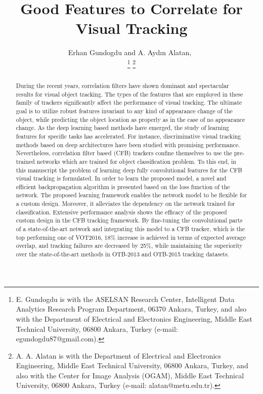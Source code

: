\documentclass[journal]{IEEEtran}
\begin{document}
\title{Good Features to Correlate for Visual Tracking}

\author{Erhan Gundogdu and
A. Ayd\i n Alatan,~



      
\thanks{E. Gundogdu is with the ASELSAN Research Center, Intelligent Data Analytics
Research Program Department, 06370 Ankara, Turkey, and also with the
Department of Electrical and Electronics Engineering, Middle East Technical
University, 06800 Ankara, Turkey (e-mail: egundogdu87@gmail.com).} \thanks{A. A. Alatan is with the Department of Electrical and Electronics
Engineering, Middle East Technical University, 06800 Ankara, Turkey, and
also with the Center for Image Analysis (OGAM), Middle East Technical University,
06800 Ankara, Turkey (e-mail: alatan@metu.edu.tr).}}


\maketitle


\begin{abstract}
During the recent years, correlation filters have shown dominant and spectacular results for visual object tracking. The types of the features that are employed in these family of trackers significantly affect the performance of visual tracking. The ultimate goal is to utilize robust features invariant to any kind of appearance change of the object, while predicting the object location as properly as in the case of no appearance change. As the deep learning based methods have emerged, the study of learning features for specific tasks has accelerated. For instance, discriminative visual tracking methods based on deep architectures have been studied with promising performance. Nevertheless, correlation filter based (CFB) trackers confine themselves to use the pre-trained networks which are trained for object classification problem. To this end, in this manuscript the problem of learning deep fully convolutional features for the CFB visual tracking is formulated. In order to learn the proposed model, a novel and efficient backpropagation algorithm is presented based on the loss function of the network. The proposed learning framework enables the network model to be flexible for a custom design. Moreover, it alleviates the dependency on the network trained for classification. Extensive performance analysis shows the efficacy of the proposed custom design in the CFB tracking framework. By fine-tuning the convolutional parts of a state-of-the-art network and integrating this model to a CFB tracker, which is the top performing one of VOT2016, 18\% increase is achieved in terms of expected average overlap, and tracking failures are decreased by 25\%, while maintaining the superiority over the state-of-the-art methods in OTB-2013 and OTB-2015 tracking datasets.
\end{abstract}
\end{document}
